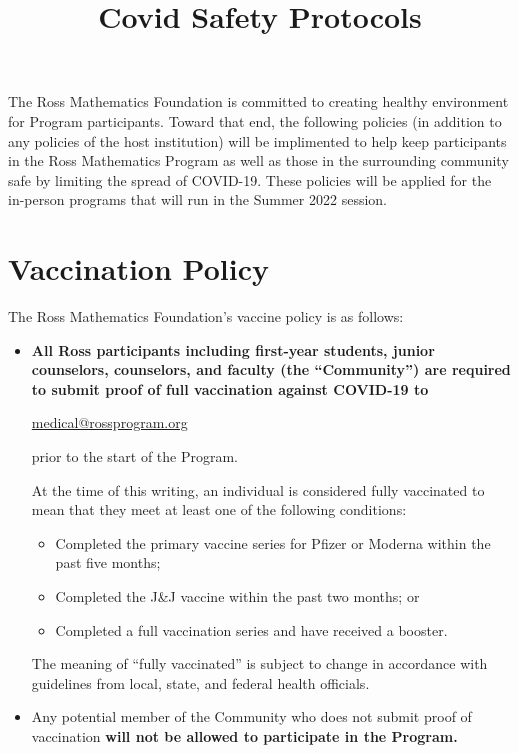\documentclass{ross}
\title{Covid Safety Protocols}
\begin{document}
\maketitle

The Ross Mathematics Foundation is committed to creating healthy environment for Program participants. Toward that end, the following policies (in addition to any policies of the host institution) will be implimented to help keep participants in the Ross Mathematics Program as well as those in the surrounding community safe by limiting the spread of COVID-19. These policies will be applied for the in-person programs that will run in the Summer 2022 session. 

\tableofcontents

\section*{Vaccination Policy}

The Ross Mathematics Foundation's vaccine policy is as follows:
\begin{itemize}
    \item {\bf All Ross participants including first-year students, junior counselors, counselors, and faculty (the ``Community'')  are required to submit proof of full vaccination against COVID-19 to 
    \begin{center}
        \href{mailto:medical@rossprogram.org}
        {medical@rossprogram.org}
    \end{center}
    prior to the start of the Program.} At the time of this writing, an individual is considered fully vaccinated to mean that they meet at least one of the following conditions:
    \begin{itemize}
        \item Completed the primary vaccine series for Pfizer or Moderna within the past five months;
        \item Completed the J\&J vaccine within the past two months; or 
        \item Completed a full vaccination series and have received a booster. 
    \end{itemize} 
    The meaning of ``fully vaccinated'' is subject to change in accordance with guidelines from local, state, and federal health officials. 
    \item Any potential member of the Community who does not submit proof of vaccination {\bf will not be allowed to participate in the Program.}
\end{itemize}
\end{document}
